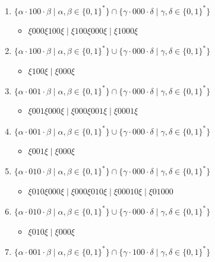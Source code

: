 \documentclass[12pt]{article}
\begin{document}
\begin{enumerate}
\begin{enumerate}[label=\arabic*)]
    \item $\{ \alpha \cdot 100 \cdot \beta \mid \alpha, \beta \in \{0, 1\}^*\} \cap \{\gamma \cdot 000 \cdot \delta \mid \gamma, \delta \in \{0, 1\}^* \}$
    \begin{itemize}
      \item $\xi 000 \xi 100 \xi \mid \xi 100 \xi 000 \xi \mid \xi 1000 \xi $
    \end{itemize}
    \item $\{ \alpha \cdot 100 \cdot \beta \mid \alpha, \beta \in \{0, 1\}^*\} \cup \{\gamma \cdot 000 \cdot \delta \mid \gamma, \delta \in \{0, 1\}^* \}$
    \begin{itemize}
      \item $\xi 100 \xi \mid \xi 000 \xi $
    \end{itemize}
    \item $\{ \alpha \cdot 001 \cdot \beta \mid \alpha, \beta \in \{0, 1\}^*\} \cap \{\gamma \cdot 000 \cdot \delta \mid \gamma, \delta \in \{0, 1\}^* \}$
    \begin{itemize}
      \item $\xi 001 \xi 000 \xi \mid \xi 000 \xi 001 \xi \mid \xi 0001 \xi $
    \end{itemize}
    \item $\{ \alpha \cdot 001 \cdot \beta \mid \alpha, \beta \in \{0, 1\}^*\} \cup \{\gamma \cdot 000 \cdot \delta \mid \gamma, \delta \in \{0, 1\}^* \}$
    \begin{itemize}
      \item $\xi 001 \xi \mid \xi 000 \xi $
    \end{itemize}
    \item $\{ \alpha \cdot 010 \cdot \beta \mid \alpha, \beta \in \{0, 1\}^*\} \cap \{\gamma \cdot 000 \cdot \delta \mid \gamma, \delta \in \{0, 1\}^* \}$
    \begin{itemize}
      \item $\xi 010 \xi 000 \xi \mid \xi 000 \xi 010 \xi \mid \xi 00010 \xi \mid \xi 01000 $
    \end{itemize}
    \item $\{ \alpha \cdot 010 \cdot \beta \mid \alpha, \beta \in \{0, 1\}^*\} \cup \{\gamma \cdot 000 \cdot \delta \mid \gamma, \delta \in \{0, 1\}^* \}$
    \begin{itemize}
      \item $\xi 010 \xi \mid \xi 000 \xi $
    \end{itemize}
    \item $\{ \alpha \cdot 001 \cdot \beta \mid \alpha, \beta \in \{0, 1\}^*\} \cap \{\gamma \cdot 100 \cdot \delta \mid \gamma, \delta \in \{0, 1\}^* \}$

\end{enumerate}
\end{enumerate}
\end{document}
